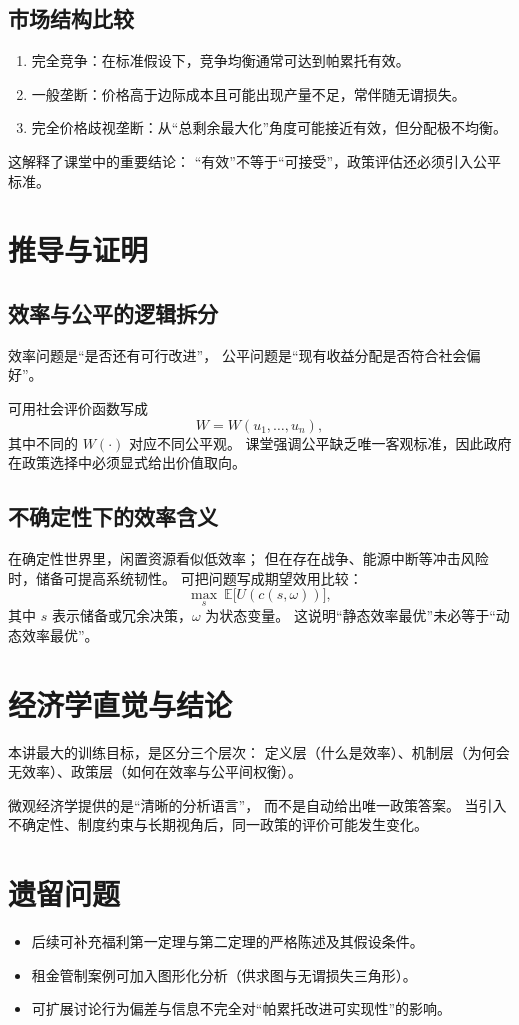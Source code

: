 \documentclass[UTF8,11pt,a4paper]{ctexart}
\newcommand{\E}{\mathbb{E}}
\begin{document}
\subsection{市场结构比较}

\begin{enumerate}
  \item 完全竞争：在标准假设下，竞争均衡通常可达到帕累托有效。
  \item 一般垄断：价格高于边际成本且可能出现产量不足，常伴随无谓损失。
  \item 完全价格歧视垄断：从“总剩余最大化”角度可能接近有效，但分配极不均衡。
\end{enumerate}

这解释了课堂中的重要结论：
“有效”不等于“可接受”，政策评估还必须引入公平标准。

\section{推导与证明}

\subsection{效率与公平的逻辑拆分}

效率问题是“是否还有可行改进”，
公平问题是“现有收益分配是否符合社会偏好”。

可用社会评价函数写成
\begin{equation}
  W = W(u_1,\dots,u_n),
\end{equation}
其中不同的 $W(\cdot)$ 对应不同公平观。
课堂强调公平缺乏唯一客观标准，因此政府在政策选择中必须显式给出价值取向。

\subsection{不确定性下的效率含义}

在确定性世界里，闲置资源看似低效率；
但在存在战争、能源中断等冲击风险时，储备可提高系统韧性。
可把问题写成期望效用比较：
\begin{equation}
  \max_{s} \ \E\big[U(c(s,\omega))\big],
\end{equation}
其中 $s$ 表示储备或冗余决策，$\omega$ 为状态变量。
这说明“静态效率最优”未必等于“动态效率最优”。

\section{经济学直觉与结论}

本讲最大的训练目标，是区分三个层次：
定义层（什么是效率）、机制层（为何会无效率）、政策层（如何在效率与公平间权衡）。

微观经济学提供的是“清晰的分析语言”，
而不是自动给出唯一政策答案。
当引入不确定性、制度约束与长期视角后，同一政策的评价可能发生变化。

\section{遗留问题}

\begin{itemize}
  \item 后续可补充福利第一定理与第二定理的严格陈述及其假设条件。
  \item 租金管制案例可加入图形化分析（供求图与无谓损失三角形）。
  \item 可扩展讨论行为偏差与信息不完全对“帕累托改进可实现性”的影响。
\end{itemize}
\end{document}
